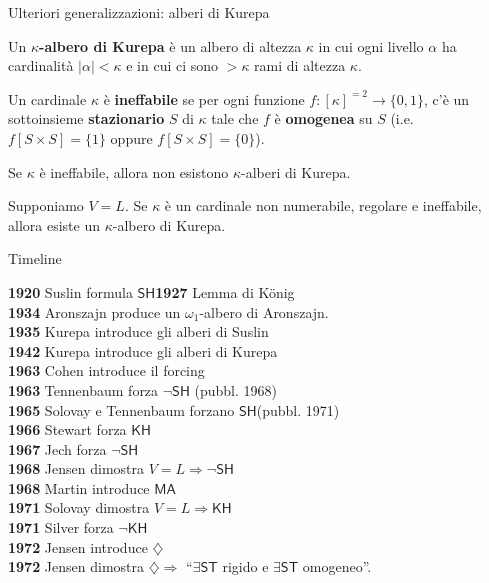 \documentclass{beamer}
\theoremstyle{num.custom-title}
\theoremstyle{custom-title}
\DeclareMathOperator{\imp}{\Rightarrow}
\newcommand{\SH}{\ensuremath{\mathsf{SH}}\xspace}
\newcommand{\MA}{\ensuremath{\mathsf{MA}}\xspace}
\newcommand{\ST}{\ensuremath{\mathsf{ST}}\xspace}
\newcommand{\KH}{\ensuremath{\mathsf{KH}}\xspace}
\renewcommand{\emph}[1]{\textbf{#1}}
\begin{document}
\begin{frame}{Ulteriori generalizzazioni: alberi di Kurepa}

\begin{definition}
Un $\kappa$\emph{-albero di Kurepa} è un albero di altezza $\kappa$ in cui ogni livello $\alpha$ ha cardinalità $|\alpha| <\kappa$ e in cui ci sono $>\kappa$ rami di altezza $\kappa$.
\end{definition}

\begin{definition}
Un cardinale $\kappa$ è \emph{ineffabile} se per ogni funzione $f \colon [\kappa]^{=2} \to \{0,1\}$, c'è un sottoinsieme \emph{stazionario} $S$ di $\kappa$ tale che $f$ è \emph{omogenea} su $S$ (i.e.\ $f[S \times S]=\{1\}$ oppure $f[S \times S]=\{0\}$).
\end{definition}

\begin{theorem}
Se $\kappa$ è ineffabile, allora non esistono $\kappa$-alberi di Kurepa.
\end{theorem}

\begin{theorem}
Supponiamo $V=L$. Se $\kappa$ è un cardinale non numerabile, regolare e ineffabile, allora esiste un $\kappa$-albero di Kurepa.
\end{theorem}

\end{frame}


\begin{frame}{Timeline}

\vspace{-5pt}

\textbf{1920} Suslin formula \SH \quad \quad \quad \textbf{1927} Lemma di König \\
\textbf{1934} Aronszajn produce un $\omega_1$-albero di Aronszajn. \\
\textbf{1935} Kurepa introduce gli alberi di Suslin \\
\textbf{1942} Kurepa introduce gli alberi di Kurepa \\
\textbf{1963} Cohen introduce il forcing \\
\textbf{1963} Tennenbaum forza $\neg\SH$ (pubbl. 1968) \\
\textbf{1965} Solovay e Tennenbaum forzano \SH (pubbl. 1971) \\
\textbf{1966} Stewart forza \KH \\
\textbf{1967} Jech forza $\neg\SH$ \\
\textbf{1968} Jensen dimostra $V=L \imp \neg\SH$ \\
\textbf{1968} Martin introduce $\MA$ \\
\textbf{1971} Solovay dimostra $V=L \imp \KH$ \\
\textbf{1971} Silver forza $\neg\KH$ \\
\textbf{1972} Jensen introduce $\diamondsuit$ \\
\textbf{1972} Jensen dimostra $\diamondsuit \imp$ ``$\exists \ST$ rigido e $\exists \ST$ omogeneo''.

\end{frame}
\end{document}

